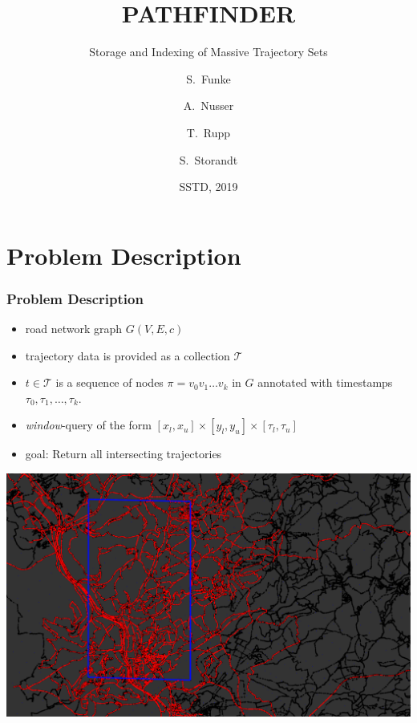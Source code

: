 \documentclass{beamer}
\title[Pathfinder] %
{PATHFINDER}
\subtitle{Storage and Indexing of Massive Trajectory Sets}
\author[Funke, Nusser, Rupp, Storandt] %
{S.~Funke\inst{1} \and A.~Nusser\inst{2} \and T.~Rupp\inst{3} \and S.~Storandt\inst{4}}
\institute[Universities] %
{
	\inst{1}%
	University of Stuttgart
	\and
	\inst{2}%
	Max Planck Institute for Informatics
	\and
	\inst{3}%
	University of Stuttgart
	\and
	\inst{4}%
	University of Konstanz
}
\date[SSTD 2019] %
{SSTD, 2019}
\begin{document}
\frame{\titlepage}

\frame{\tableofcontents[
		currentsection,
		currentsubsection,
		subsectionstyle=show/shaded/hide
	]}

\section{Problem Description}
\begin{frame}
	\frametitle{Problem Description}
	\begin{itemize}
		\item road network graph $G(V,E,c)$ \pause
		\item trajectory data is provided as a collection $\mathcal{T}$ \pause
		\item $t\in \mathcal{T}$ is a sequence of nodes $\pi=v_0 v_1 \dots v_k$ in  $G$ annotated with timestamps $\tau_0, \tau_1, \dots, \tau_k$. \pause
		\item \emph{window}-query of the form $[x_l, x_u]\times[y_l, y_u]\times[\tau_l, \tau_u]$ \pause
		\item goal: Return all intersecting trajectories \pause


	\end{itemize}
	\includegraphics[width=0.95\linewidth]{graphics/saarland_real_data_gimp.pdf}
\end{frame}
\end{document}
